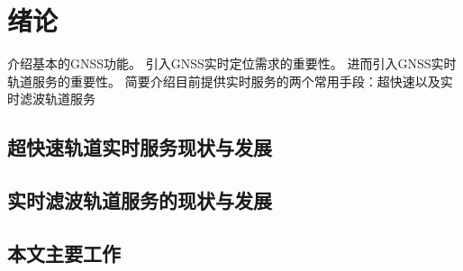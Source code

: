 
\chapter{绪论}
介绍基本的GNSS功能。
引入GNSS实时定位需求的重要性。
进而引入GNSS实时轨道服务的重要性。
简要介绍目前提供实时服务的两个常用手段：超快速以及实时滤波轨道服务
\section{超快速轨道实时服务现状与发展}
\section{实时滤波轨道服务的现状与发展}
\section{本文主要工作}